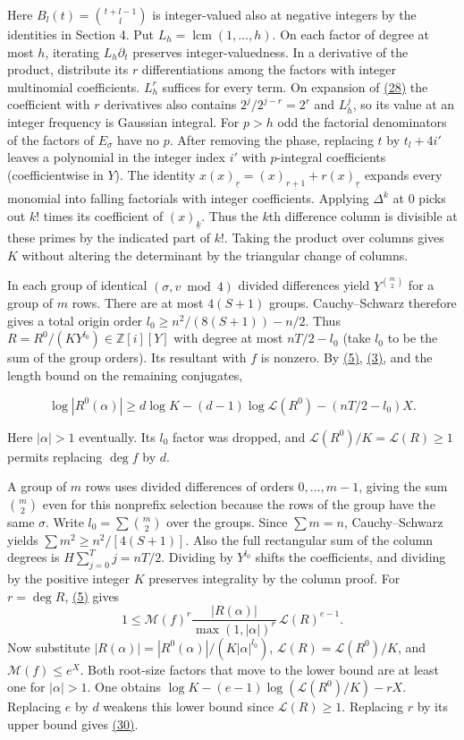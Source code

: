 \documentclass[11pt,a4paper]{article}
\begin{document}
Here \(B_l(t)=\binom{t+l-1}l\) is integer-valued also at negative integers by the identities in Section 4. Put \(L_h=\operatorname{lcm}(1,\ldots,h)\). On each factor of degree at most \(h\), iterating \(L_h\partial_t\) preserves integer-valuedness. In a derivative of the product, distribute its \(r\) differentiations among the factors with integer multinomial coefficients. \(L_h^r\) suffices for every term. On expansion of \hyperref[eq:28]{(28)} the coefficient with \(r\) derivatives also contains \(2^j/2^{j-r}=2^r\) and \(L_h^j\), so its value at an integer frequency is Gaussian integral. For \(p>h\) odd the factorial denominators of the factors of \(E_\sigma\) have no \(p\). After removing the phase, replacing \(t\) by \(t_l+4i'\) leaves a polynomial in the integer index \(i'\) with \(p\)-integral coefficients (coefficientwise in \(Y\)). The identity \(x(x)_{\underline r}=(x)_{\underline{r+1}}+r(x)_{\underline r}\) expands every monomial into falling factorials with integer coefficients. Applying \(\Delta^k\) at \(0\) picks out \(k!\) times its coefficient of \((x)_{\underline k}\). Thus the \(k\)th difference column is divisible at these primes by the indicated part of \(k!\). Taking the product over columns gives \(K\) without altering the determinant by the triangular change of columns.

In each group of identical \((\sigma,v\bmod4)\) divided differences yield \(Y^{\binom{m}{2}}\) for a group of \(m\) rows. There are at most \(4(S+1)\) groups. Cauchy--Schwarz therefore gives a total origin order \(l_0\ge n^2/(8(S+1))-n/2\). Thus \(R=R^0/(KY^{l_0})\in\mathbb Z[i][Y]\) with degree at most \(nT/2-l_0\) (take \(l_0\) to be the sum of the group orders). Its resultant with \(f\) is nonzero. By \hyperref[eq:5]{(5)}, \hyperref[eq:3]{(3)}, and the length bound on the remaining conjugates,

\[
 \log|R^0(\alpha)|\ge
 d\log K-(d-1)\log\mathcal L(R^0)-(nT/2-l_0)X .                          \tag{30}\label{eq:30}
\]

Here \(|\alpha|>1\) eventually. Its \(l_0\) factor was dropped, and \(\mathcal L(R^0)/K=\mathcal L(R)\ge1\) permits replacing \(\deg f\) by \(d\).

A group of \(m\) rows uses divided differences of orders \(0,\ldots,m-1\), giving the sum \(\binom m2\) even for this nonprefix selection because the rows of the group have the same \(\sigma\). Write \(l_0=\sum\binom m2\) over the groups. Since \(\sum m=n\), Cauchy--Schwarz yields \(\sum m^2\ge n^2/[4(S+1)]\). Also the full rectangular sum of the column degrees is \(H\sum_{j=0}^Tj=nT/2\). Dividing by \(Y^{l_0}\) shifts the coefficients, and dividing by the positive integer \(K\) preserves integrality by the column proof. For \(r=\deg R\), \hyperref[eq:5]{(5)} gives \[
 1\le \mathcal M(f)^r
       \frac{|R(\alpha)|}{\max(1,|\alpha|)^r}\,
       \mathcal L(R)^{e-1}.
\] Now substitute \(|R(\alpha)|=|R^0(\alpha)|/(K|\alpha|^{l_0})\), \(\mathcal L(R)=\mathcal L(R^0)/K\), and \(\mathcal M(f)\le e^X\). Both root-size factors that move to the lower bound are at least one for \(|\alpha|>1\). One obtains \(\log K-(e-1)\log(\mathcal L(R^0)/K)-rX\). Replacing \(e\) by \(d\) weakens this lower bound since \(\mathcal L(R)\ge1\). Replacing \(r\) by its upper bound gives \hyperref[eq:30]{(30)}.
\end{document}
